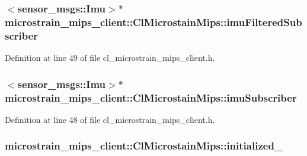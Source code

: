 \subsubsection[{\texorpdfstring{imu\+Filtered\+Subscriber}{imuFilteredSubscriber}}]{$<$sensor\+\_\+msgs\+::\+Imu$>$$\ast$ microstrain\+\_\+mips\+\_\+client\+::\+Cl\+Microstain\+Mips\+::imu\+Filtered\+Subscriber}\hypertarget{classmicrostrain__mips__client_1_1ClMicrostainMips_aab9328daa06d3a492582e8ade730dee3}{}\label{classmicrostrain__mips__client_1_1ClMicrostainMips_aab9328daa06d3a492582e8ade730dee3}


Definition at line 49 of file cl\+\_\+microstrain\+\_\+mips\+\_\+client.\+h.

\subsubsection[{\texorpdfstring{imu\+Subscriber}{imuSubscriber}}]{$<$sensor\+\_\+msgs\+::\+Imu$>$$\ast$ microstrain\+\_\+mips\+\_\+client\+::\+Cl\+Microstain\+Mips\+::imu\+Subscriber}\hypertarget{classmicrostrain__mips__client_1_1ClMicrostainMips_a1d1c48b4bb3c666e93b38f055f51d3dd}{}\label{classmicrostrain__mips__client_1_1ClMicrostainMips_a1d1c48b4bb3c666e93b38f055f51d3dd}


Definition at line 48 of file cl\+\_\+microstrain\+\_\+mips\+\_\+client.\+h.

\subsubsection[{\texorpdfstring{initialized\+\_\+}{initialized_}}]{ microstrain\+\_\+mips\+\_\+client\+::\+Cl\+Microstain\+Mips\+::initialized\+\_\+\hspace{0.3cm}{\ttfamily [protected]}}\hypertarget{classmicrostrain__mips__client_1_1ClMicrostainMips_abe679d92e247188d0664941babbf85f0}{}\label{classmicrostrain__mips__client_1_1ClMicrostainMips_abe679d92e247188d0664941babbf85f0}


